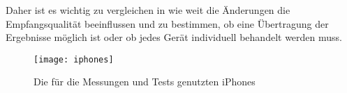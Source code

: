 Daher ist es wichtig zu vergleichen in wie weit die Änderungen die Empfangsqualität beeinflussen und zu bestimmen, ob eine Übertragung der Ergebnisse möglich ist oder ob jedes Gerät individuell behandelt werden muss.

\begin{figure}[htb!]
		\centering
	\texttt{[image: iphones]}
	\caption{Die für die Messungen und Tests genutzten iPhones}
	\label{iphones}
\end{figure}




